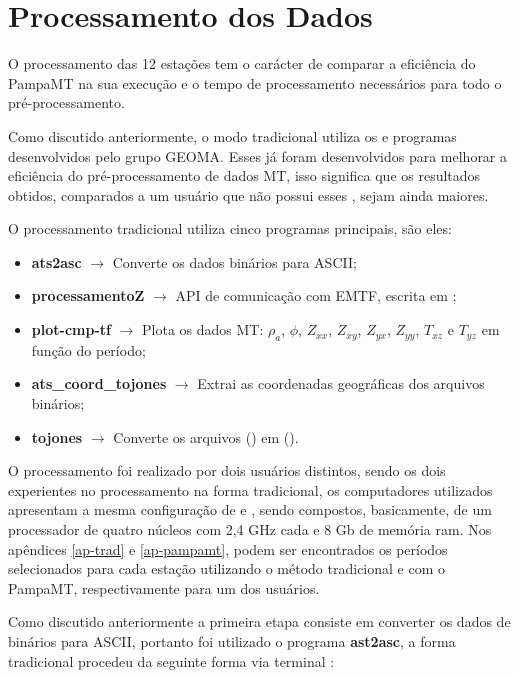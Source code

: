     \section{Processamento dos Dados}
    
        O processamento das 12 estações tem o carácter de comparar a eficiência do PampaMT na sua execução e o tempo de processamento necessários para todo o pré-processamento.
        
        Como discutido anteriormente, o modo tradicional utiliza os  e programas desenvolvidos pelo grupo GEOMA. Esses  já foram desenvolvidos para melhorar a eficiência do pré-processamento de dados MT, isso significa que os resultados obtidos, comparados a um usuário que não possui esses , sejam ainda maiores.  
        
        O processamento tradicional utiliza cinco programas principais, são eles:
        
        \begin{itemize}
         \item \textbf{ats2asc} $\rightarrow$ Converte os dados binários para ASCII;
         \item \textbf{processamentoZ} $\rightarrow$ API de comunicação com EMTF, escrita em ;
         \item \textbf{plot-cmp-tf} $\rightarrow$ Plota os dados MT: $\rho_a$, $\phi$, $Z_{xx}$, $Z_{xy}$, $Z_{yx}$, $Z_{yy}$, $T_{xz}$ e $T_{yz}$ em função do período; 
         \item \textbf{ats\_coord\_tojones} $\rightarrow$ Extrai as coordenadas geográficas dos arquivos binários;
         \item \textbf{tojones} $\rightarrow$ Converte os arquivos  () em  ().
        \end{itemize}

        O processamento foi realizado por dois usuários distintos, sendo os dois experientes no processamento na forma tradicional, os computadores utilizados apresentam a mesma configuração de  e , sendo compostos, basicamente, de um processador de quatro núcleos com 2,4 GHz cada e 8 Gb de memória ram. Nos apêndices \ref{ap-trad} e \ref{ap-pampamt}, podem ser encontrados os períodos selecionados para cada estação utilizando o método tradicional e com o PampaMT, respectivamente para um dos usuários.
        
    Como discutido anteriormente a primeira etapa consiste em converter os dados de binários para ASCII, portanto foi utilizado o programa \textbf{ast2asc}, a forma tradicional procedeu da seguinte forma via terminal :
    
